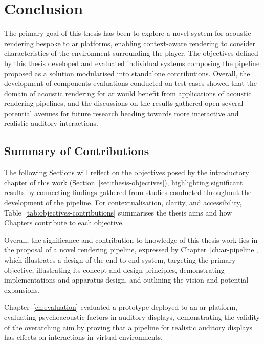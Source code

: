 \chapter{Conclusion}\label{ch:conclusion}
The primary goal of this thesis has been to explore a novel system for acoustic rendering bespoke to \acrshort{ar} platforms, enabling context-aware rendering to consider characteristics of the environment surrounding the player. The objectives defined by this thesis developed and evaluated individual systems composing the pipeline proposed as a solution modularised into standalone contributions. Overall, the development of components evaluations conducted on test cases showed that the domain of acoustic rendering for \acrshort{ar} would benefit from applications of acoustic rendering pipelines, and the discussions on the results gathered open several potential avenues for future research heading towards more interactive and realistic auditory interactions.

\section{Summary of Contributions}
The following Sections will reflect on the objectives posed by the introductory chapter of this work (Section~\ref{sec:thesis-objectives}), highlighting significant results by connecting findings gathered from studies conducted throughout the development of the pipeline. For contextualisation, clarity, and accessibility, Table~\ref{tab:objectives-contributions} summarises the thesis aims and how Chapters contribute to each objective.



Overall, the significance and contribution to knowledge of this thesis work lies in the proposal of a novel rendering pipeline, expressed by Chapter~\ref{ch:ar-pipeline}, which illustrates a design of the end-to-end system, targeting the primary objective, illustrating its concept and design principles, demonstrating implementations and apparatus design, and outlining the vision and potential expansions.\par
Chapter~\ref{ch:evaluation} evaluated a prototype deployed to an \acrshort{ar} platform, evaluating psychoacoustic factors in auditory displays, demonstrating the validity of the overarching aim by proving that a pipeline for realistic auditory displays has effects on interactions in virtual environments.\par

